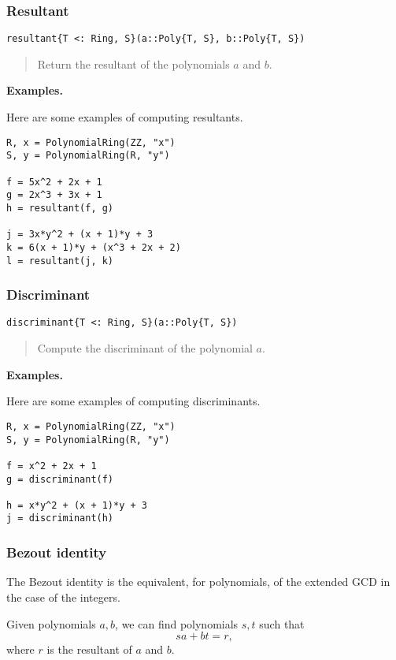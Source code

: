 \documentclass[a4paper,10pt]{article}
\newcommand{\desc}[1]{\vspace{-3mm}\begin{quote}#1\end{quote}}
\begin{document}
{{{\subsubsection{Resultant}

\begin{lstlisting}
resultant{T <: Ring, S}(a::Poly{T, S}, b::Poly{T, S})
\end{lstlisting}

\desc{Return the resultant of the polynomials $a$ and $b$.}

\textbf{Examples.}

Here are some examples of computing resultants.

\begin{lstlisting}
R, x = PolynomialRing(ZZ, "x")
S, y = PolynomialRing(R, "y")

f = 5x^2 + 2x + 1
g = 2x^3 + 3x + 1
h = resultant(f, g)

j = 3x*y^2 + (x + 1)*y + 3
k = 6(x + 1)*y + (x^3 + 2x + 2)
l = resultant(j, k)
\end{lstlisting}

\subsubsection{Discriminant}

\begin{lstlisting}
discriminant{T <: Ring, S}(a::Poly{T, S})
\end{lstlisting}

\desc{Compute the discriminant of the polynomial $a$.}

\textbf{Examples.}

Here are some examples of computing discriminants.

\begin{lstlisting}
R, x = PolynomialRing(ZZ, "x")
S, y = PolynomialRing(R, "y")

f = x^2 + 2x + 1
g = discriminant(f)

h = x*y^2 + (x + 1)*y + 3
j = discriminant(h)
\end{lstlisting}

\subsubsection{Bezout identity}

The Bezout identity is the equivalent, for polynomials, of the extended GCD
in the case of the integers.

Given polynomials $a, b$, we can find polynomials $s, t$ such that
$$sa + bt = r,$$
where $r$ is the resultant of $a$ and $b$.

}}}
\end{document}
